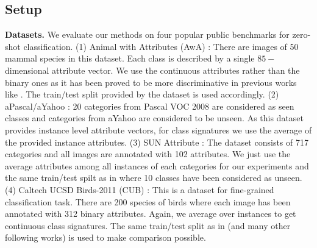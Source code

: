 \documentclass[10pt,twocolumn,letterpaper]{article}
\begin{document}
\subsection{Setup} \label{setup}
\textbf{Datasets.}
We evaluate our methods on four popular public benchmarks for zero-shot classification.
(1) Animal with Attributes (AwA) \cite{lampert09}: There are images of 50 mammal species in this dataset.
Each class is described by a single $85-$dimensional attribute vector. We use the continuous attributes rather than
the binary ones as it has been proved to be more discriminative in previous works like \cite{Akata2015}. The train/test split provided by the dataset is used accordingly.
(2) aPascal/aYahoo \cite{farhadi09}: 20 categories from Pascal VOC 2008 \cite{pascal} are considered as seen classes and
categories from aYahoo are considered to be unseen. As this dataset provides instance level attribute vectors,
for class signatures we use the average of the provided instance attributes.
(3) SUN Attribute \cite{sun}: The dataset consists of 717 categories and all images are annotated with 102 attributes. We just
use the average attributes among all instances of each categories for our experiments and the same train/test spilt
as in \cite{jayaraman14} where 10 classes have been considered as unseen.
(4) Caltech UCSD Birds-2011 (CUB) \cite{cub}: This is a dataset for fine-grained classification task. There are 200 species of
birds where each image has been annotated with 312 binary attributes. Again, we average over instances to get continuous class signatures.
The same train/test split as in \cite{akata13} (and many other following works) is used to make comparison possible.
\end{document}
